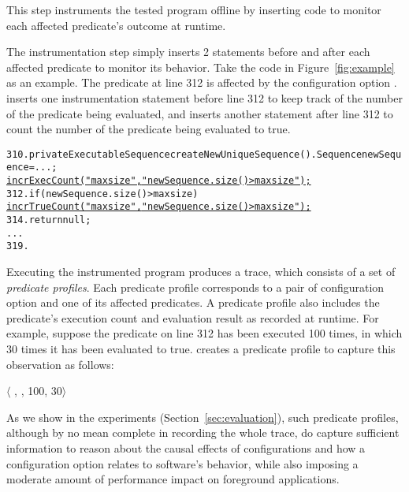 This step instruments the tested program offline
by inserting code to monitor each affected predicate's outcome
at runtime.

The instrumentation step simply inserts 2 statements
before and after each affected predicate to monitor
its behavior. Take
the code in Figure~\ref{fig:example} as an example.
The predicate at line 312 is affected by
the configuration option . \ourtool inserts
one instrumentation statement before line 312 to
keep track of the number of the predicate being evaluated, and
inserts another statement after line 312 to count the number
of the predicate being evaluated to true.


\begin{CodeOut}
\begin{alltt}
310. private ExecutableSequence createNewUniqueSequence() .   Sequence newSequence = ...; 
       \underline{incrExecCount("maxsize", "newSequence.size() > maxsize");}
312.   if (newSequence.size() > maxsize) \ttlcb
         \underline{incrTrueCount("maxsize", "newSequence.size() > maxsize");}
314.     return null;
      ...
319. \ttrcb
\end{alltt}
\end{CodeOut}


Executing the instrumented program
produces a trace, which consists of a set of \textit{predicate profiles}.
Each predicate profile corresponds to a pair of configuration option
and one of its affected predicates. A predicate profile also includes
the predicate's execution count and evaluation result as recorded at runtime. For example,
suppose the predicate on line 312 has been executed 100 times, in which
30 times it has been evaluated to true. \ourtool creates a predicate
profile to capture this observation as follows:

$\langle$ , , 100, 30$\rangle$ 

\vspace{1mm}


As we show in the experiments (Section~\ref{sec:evaluation}),
such predicate profiles, although by no mean complete in
recording the whole trace, do capture
sufficient information to reason about the causal effects of configurations
and how a configuration option relates to software's behavior, while
also imposing a moderate amount of performance impact
on foreground applications.





